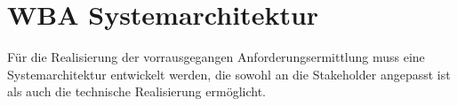 
\chapter{WBA Systemarchitektur}

Für die Realisierung der vorrausgegangen Anforderungsermittlung muss eine Systemarchitektur entwickelt werden, die sowohl an die Stakeholder angepasst ist als auch die technische Realisierung ermöglicht.\\



\newpage



\newpage



\newpage




%
